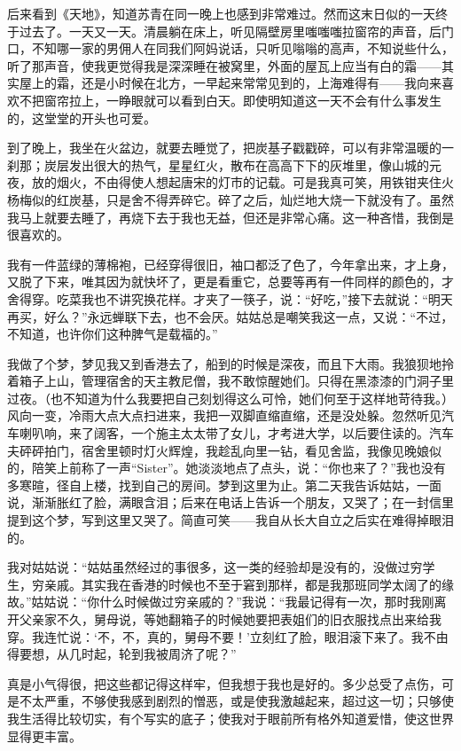 \par 后来看到《天地》，知道苏青在同一晚上也感到非常难过。然而这末日似的一天终于过去了。一天又一天。清晨躺在床上，听见隔壁房里嗤嗤嗤拉窗帘的声音，后门口，不知哪一家的男佣人在同我们阿妈说话，只听见嗡嗡的高声，不知说些什么，听了那声音，使我更觉得我是深深睡在被窝里，外面的屋瓦上应当有白的霜——其实屋上的霜，还是小时候在北方，一早起来常常见到的，上海难得有——我向来喜欢不把窗帘拉上，一睁眼就可以看到白天。即使明知道这一天不会有什么事发生的，这堂堂的开头也可爱。
\par 到了晚上，我坐在火盆边，就要去睡觉了，把炭基子戳戳碎，可以有非常温暖的一刹那；炭层发出很大的热气，星星红火，散布在高高下下的灰堆里，像山城的元夜，放的烟火，不由得使人想起唐宋的灯市的记载。可是我真可笑，用铁钳夹住火杨梅似的红炭基，只是舍不得弄碎它。碎了之后，灿烂地大烧一下就没有了。虽然我马上就要去睡了，再烧下去于我也无益，但还是非常心痛。这一种吝惜，我倒是很喜欢的。
\par 我有一件蓝绿的薄棉袍，已经穿得很旧，袖口都泛了色了，今年拿出来，才上身，又脱了下来，唯其因为就快坏了，更是看重它，总要等再有一件同样的颜色的，才舍得穿。吃菜我也不讲究换花样。才夹了一筷子，说：“好吃，”接下去就说：“明天再买，好么？”永远蝉联下去，也不会厌。姑姑总是嘲笑我这一点，又说：“不过，不知道，也许你们这种脾气是载福的。”
\par 我做了个梦，梦见我又到香港去了，船到的时候是深夜，而且下大雨。我狼狈地拎着箱子上山，管理宿舍的天主教尼僧，我不敢惊醒她们。只得在黑漆漆的门洞子里过夜。（也不知道为什么我要把自己刻划得这么可怜，她们何至于这样地苛待我。）风向一变，冷雨大点大点扫进来，我把一双脚直缩直缩，还是没处躲。忽然听见汽车喇叭响，来了阔客，一个施主太太带了女儿，才考进大学，以后要住读的。汽车夫砰砰拍门，宿舍里顿时灯火辉煌，我趁乱向里一钻，看见舍监，我像见晚娘似的，陪笑上前称了一声“Sister”。她淡淡地点了点头，说：“你也来了？”我也没有多寒暄，径自上楼，找到自己的房间。梦到这里为止。第二天我告诉姑姑，一面说，渐渐胀红了脸，满眼含泪；后来在电话上告诉一个朋友，又哭了；在一封信里提到这个梦，写到这里又哭了。简直可笑——我自从长大自立之后实在难得掉眼泪的。
\par 我对姑姑说：“姑姑虽然经过的事很多，这一类的经验却是没有的，没做过穷学生，穷亲戚。其实我在香港的时候也不至于窘到那样，都是我那班同学太阔了的缘故。”姑姑说：“你什么时候做过穷亲戚的？”我说：“我最记得有一次，那时我刚离开父亲家不久，舅母说，等她翻箱子的时候她要把表姐们的旧衣服找点出来给我穿。我连忙说：‘不，不，真的，舅母不要！’立刻红了脸，眼泪滚下来了。我不由得要想，从几时起，轮到我被周济了呢？”
\par 真是小气得很，把这些都记得这样牢，但我想于我也是好的。多少总受了点伤，可是不太严重，不够使我感到剧烈的憎恶，或是使我激越起来，超过这一切；只够使我生活得比较切实，有个写实的底子；使我对于眼前所有格外知道爱惜，使这世界显得更丰富。
